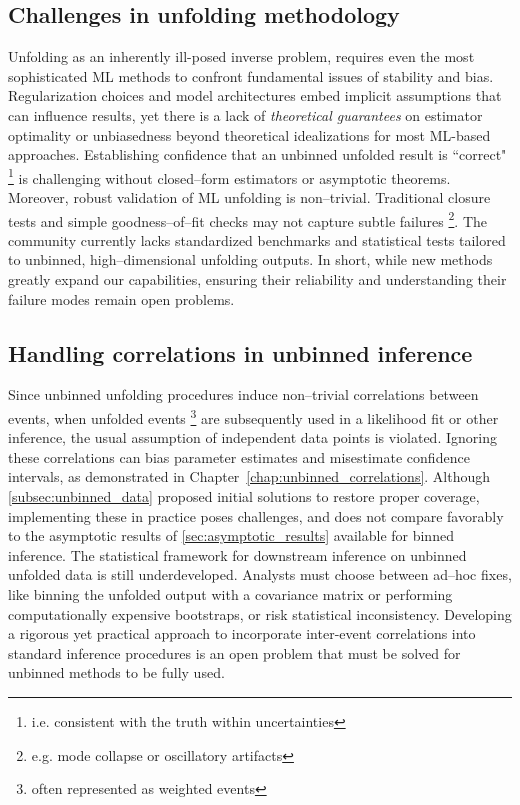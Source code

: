     \subsection{Challenges in unfolding methodology}
        Unfolding as an inherently ill-posed inverse problem, requires even the most sophisticated ML methods to confront fundamental issues of stability and bias.
        Regularization choices and model architectures embed implicit assumptions that can influence results, yet there is a lack of \emph{theoretical guarantees} on estimator optimality or unbiasedness beyond theoretical idealizations for most ML-based approaches.
        Establishing confidence that an unbinned unfolded result is ``correct" \footnote{i.e. consistent with the truth within uncertainties} is challenging without closed--form estimators or asymptotic theorems.
        Moreover, robust validation of ML unfolding is non--trivial.
        Traditional closure tests and simple goodness--of--fit checks may not capture subtle failures \footnote{e.g. mode collapse or oscillatory artifacts}.
        The community currently lacks standardized benchmarks and statistical tests tailored to unbinned, high--dimensional unfolding outputs.
        In short, while new methods greatly expand our capabilities, ensuring their reliability and understanding their failure modes remain open problems.
    \subsection{Handling correlations in unbinned inference}
        Since unbinned unfolding procedures induce non--trivial correlations between events, when unfolded events \footnote{often represented as weighted events} are subsequently used in a likelihood fit or other inference, the usual assumption of independent data points is violated.
        Ignoring these correlations can bias parameter estimates and misestimate confidence intervals, as demonstrated in Chapter~\ref{chap:unbinned_correlations}.
        Although \cref{subsec:unbinned_data} proposed initial solutions to restore proper coverage, implementing these in practice poses challenges, and does not compare favorably to the asymptotic results of \cref{sec:asymptotic_results} available for binned inference.
        The statistical framework for downstream inference on unbinned unfolded data is still underdeveloped.
        Analysts must choose between ad--hoc fixes, like binning the unfolded output with a covariance matrix or performing computationally expensive bootstraps, or risk statistical inconsistency.
        Developing a rigorous yet practical approach to incorporate inter-event correlations into standard inference procedures is an open problem that must be solved for unbinned methods to be fully used.
